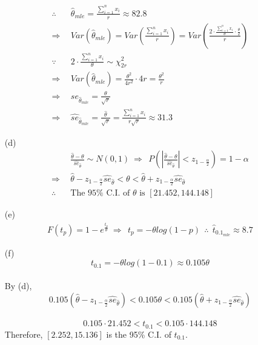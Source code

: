 \documentclass[paper=a4, fontsize=12pt]{scrartcl} %
\numberwithin{equation}{section} %
\numberwithin{figure}{section} %
\numberwithin{table}{section} %
\begin{document}
\begin{itemize}
\begin{align*}
				\therefore\ \ & \widehat{\theta}_{mle} = \frac{\sum_{i = 1}^nx_{i}}{r}\approx 82.8\\
				\Rightarrow \ \	& Var\left(\widehat{\theta}_{mle}\right) = Var\left(\frac{\sum_{i = 1}^nx_{i}}{r}\right) = Var\left( \frac{2\cdot\frac{\sum_{i = 1}^nx_{i}}{\theta}\cdot\frac{\theta}{2}}{r} \right) \\
				\because\ \ & 2\cdot\frac{\sum_{i = 1}^nx_{i}}{\theta} \sim \chi_{2r}^2 \\
				\Rightarrow \ \	& Var\left(\widehat{\theta}_{mle}\right) = \frac{\theta^2}{4r^2}\cdot 4r = \frac{\theta^2}{r}\\
				\Rightarrow \ \	& se_{\widehat{\theta}_{mle}} = \frac{\theta}{\sqrt{r}} \\
				\Rightarrow \ \	& \widehat{se}_{\widehat{\theta}_{mle}} =  \frac{\widehat{\theta}}{\sqrt{r}} = \frac{\sum_{i = 1}^nx_i}{r\sqrt{r}} \approx 31.3
			\end{align*}
	\item[(d)]	\begin{align*}
							& \frac{\widehat{\theta} - \theta}{\widehat{se}_{\widehat{\theta}}} \sim N(0, 1) \ \Rightarrow \ \ P\left( \left| \frac{\widehat{\theta} - \theta}{\widehat{se}_{\widehat{\theta}}} \right| < z_{1-\frac{\alpha}{2}}\right) = 1-\alpha \\
				\Rightarrow \ \	& \widehat{\theta} - z_{1-\frac{\alpha}{2}}\widehat{se}_{\widehat{\theta}} < \theta < \widehat{\theta} + z_{1-\frac{\alpha}{2}}\widehat{se}_{\widehat{\theta}}\\
				\therefore \ \ 	& \text{The $95\%$ C.I. of $\theta$ is $\left[21.452, 144.148\right]$}
			\end{align*}
	\item[(e)]	\begin{align*}
							F(t_p) = 1- e^{\frac{t_p}{\theta}}\ \Rightarrow \ \ t_p = -\theta log(1-p)
			\ \ 	\therefore\ \ 		\widehat{t}_{0.1_{mle}} \approx 8.7
			\end{align*}
	\item[(f)]	$$t_{0.1} = -\theta log(1-0.1)\approx 0.105\theta$$\\
			By (d), $$0.105\left(\widehat{\theta} - z_{1-\frac{\alpha}{2}}\widehat{se}_{\widehat{\theta}}\right) < 0.105\theta < 0.105\left(\widehat{\theta} + z_{1-\frac{\alpha}{2}}\widehat{se}_{\widehat{\theta}}\right)$$\\
			$$0.105\cdot 21.452 < t_{0.1}<0.105\cdot 144.148$$
			Therefore, $\left[ 2.252, 15.136\right]$ is the 95\% C.I. of $t_{0.1}$.
\end{itemize}
\end{document}
